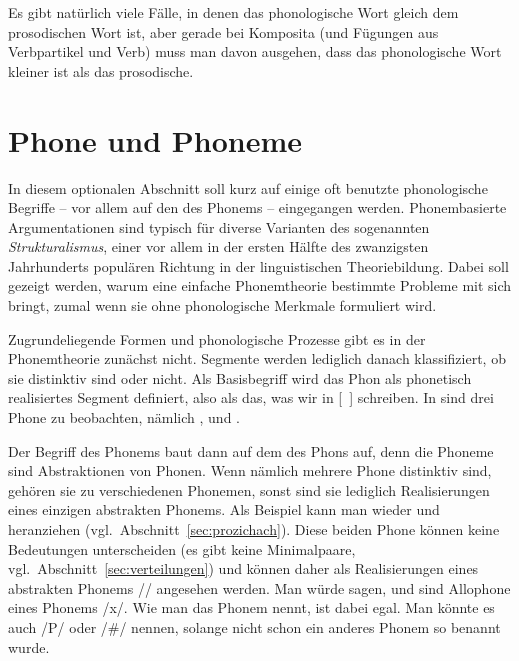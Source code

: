 Es gibt natürlich viele Fälle, in denen das phonologische Wort gleich dem prosodischen Wort ist, aber gerade bei Komposita (und \zB Fügungen aus Verbpartikel und Verb) muss man davon ausgehen, dass das phonologische Wort kleiner ist als das prosodische.


\section[Phone und Phoneme]{\Opsional Phone und Phoneme}

\label{sec:phonphonem}

In diesem optionalen Abschnitt soll kurz auf einige oft benutzte phonologische Begriffe -- vor allem auf den des Phonems -- eingegangen werden.
Phonembasierte Argumentationen sind typisch für diverse Varianten des sogenannten \textit{Strukturalismus}, einer vor allem in der ersten Hälfte des zwanzigsten Jahrhunderts populären Richtung in der linguistischen Theoriebildung.
Dabei soll gezeigt werden, warum eine einfache Phonemtheorie bestimmte Probleme mit sich bringt, zumal wenn sie ohne phonologische Merkmale formuliert wird.

Zugrundeliegende Formen und phonologische Prozesse gibt es in der Phonemtheorie zunächst nicht.
Segmente werden lediglich danach klassifiziert, ob sie distinktiv sind oder nicht.
Als Basisbegriff wird das Phon als phonetisch realisiertes Segment definiert, also als das, was wir in [~] schreiben.
In \textipa{[ta:k]} sind drei Phone zu beobachten, nämlich \textipa{[t]}, \textipa{[a:]} und \textipa{[k]}.


Der Begriff des Phonems baut dann auf dem des Phons auf, denn die Phoneme sind Abstraktionen von Phonen.
Wenn nämlich mehrere Phone distinktiv sind, gehören sie zu verschiedenen Phonemen, sonst sind sie lediglich Realisierungen eines einzigen abstrakten Phonems.
Als Beispiel kann man wieder \textipa{[\c{c}]} und \textipa{[X]} heranziehen (vgl.\ Abschnitt~\ref{sec:prozichach}).
Diese beiden Phone können keine Bedeutungen unterscheiden (es gibt keine Minimalpaare, vgl.\ Abschnitt~\ref{sec:verteilungen}) und können daher als Realisierungen eines abstrakten Phonems // angesehen werden.
Man würde sagen, \textipa{[\c{c}]} und \textipa{[X]} sind Allophone eines Phonems /x/.
Wie man das Phonem nennt, ist dabei egal.
Man könnte es auch /P/ oder /\#/ nennen, solange nicht schon ein anderes Phonem so benannt wurde.

